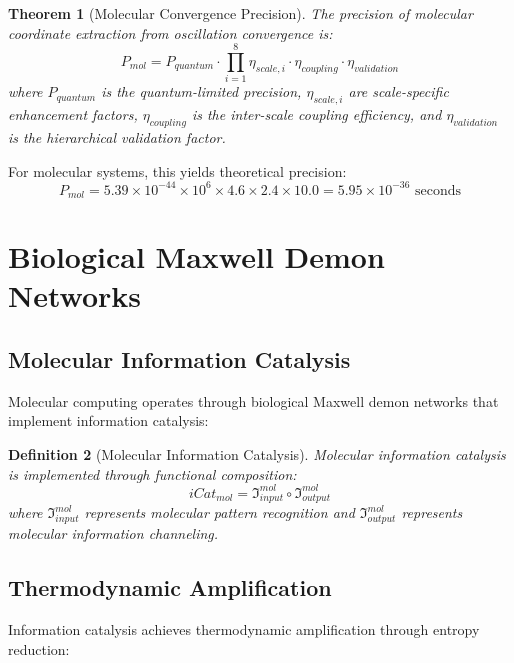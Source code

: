 \documentclass[12pt,a4paper]{article}
\newtheorem{theorem}{Theorem}[section]
\newtheorem{definition}[theorem]{Definition}
\begin{document}
\begin{theorem}[Molecular Convergence Precision]
The precision of molecular coordinate extraction from oscillation convergence is:
\begin{equation}
P_{mol} = P_{quantum} \cdot \prod_{i=1}^{8} \eta_{scale,i} \cdot \eta_{coupling} \cdot \eta_{validation}
\end{equation}
where $P_{quantum}$ is the quantum-limited precision, $\eta_{scale,i}$ are scale-specific enhancement factors, $\eta_{coupling}$ is the inter-scale coupling efficiency, and $\eta_{validation}$ is the hierarchical validation factor.
\end{theorem}

For molecular systems, this yields theoretical precision:
\begin{equation}
P_{mol} = 5.39 \times 10^{-44} \times 10^6 \times 4.6 \times 2.4 \times 10.0 = 5.95 \times 10^{-36} \text{ seconds}
\end{equation}

\section{Biological Maxwell Demon Networks}

\subsection{Molecular Information Catalysis}

Molecular computing operates through biological Maxwell demon networks that implement information catalysis:

\begin{definition}[Molecular Information Catalysis]
Molecular information catalysis is implemented through functional composition:
\begin{equation}
iCat_{mol} = \mathfrak{I}_{input}^{mol} \circ \mathfrak{I}_{output}^{mol}
\end{equation}
where $\mathfrak{I}_{input}^{mol}$ represents molecular pattern recognition and $\mathfrak{I}_{output}^{mol}$ represents molecular information channeling.
\end{definition}

\subsection{Thermodynamic Amplification}

Information catalysis achieves thermodynamic amplification through entropy reduction:
\end{document}

